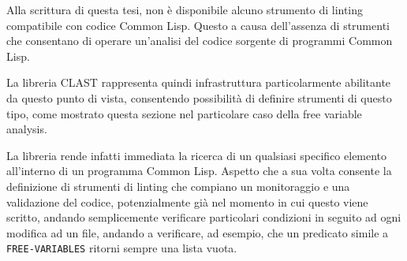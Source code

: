 Alla scrittura di questa tesi, non è disponibile alcuno strumento di linting
compatibile con codice Common Lisp. Questo a causa dell'assenza di strumenti che consentano di operare un'analisi del codice sorgente di programmi Common Lisp.

La libreria CLAST rappresenta quindi infrastruttura particolarmente abilitante
da questo punto di vista, consentendo possibilità di definire strumenti di
questo tipo, come mostrato  questa sezione nel particolare caso della free
variable analysis.

La libreria rende infatti immediata la ricerca di un qualsiasi specifico
elemento all'interno di un programma Common Lisp. Aspetto che a sua volta
consente la definizione di strumenti di linting che compiano un monitoraggio e
una validazione del codice, potenzialmente già nel momento in cui questo viene
scritto, andando semplicemente verificare particolari condizioni in seguito ad
ogni modifica ad un file, andando a verificare, ad esempio, che un predicato
simile a \texttt{FREE-VARIABLES} ritorni sempre una lista vuota.
